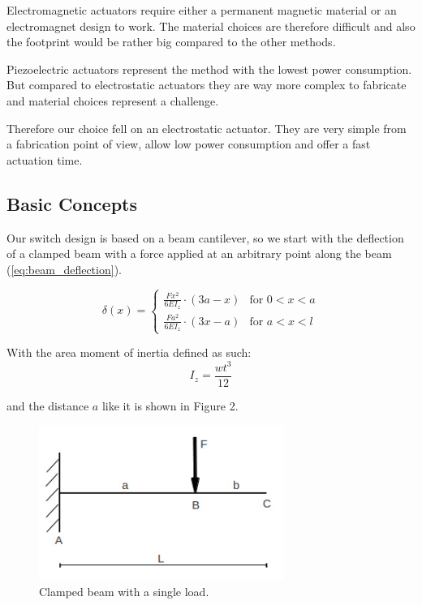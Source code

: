 Electromagnetic actuators require either a permanent magnetic material or an electromagnet design to work.
The material choices are therefore difficult and also the footprint would be rather big compared to the other methods.

Piezoelectric actuators represent the method with the lowest power consumption.
But compared to electrostatic actuators they are way more complex to fabricate and material choices represent a challenge.\cite{klaasse2002piezoelectric}

Therefore our choice fell on an electrostatic actuator.
They are very simple from a fabrication point of view, allow low power consumption and offer a fast actuation time.

\subsection{Basic Concepts}
\label{sec:basic_concepts}

Our switch design is based on a beam cantilever, so we start with the deflection of a clamped beam with a force applied at an arbitrary point along the beam (\ref{eq:beam_deflection}).

\begin{equation}
    \delta(x) = \begin{cases} \frac{Fx^2}{6EI_z} \cdot (3a-x) & \mbox{for } 0 < x < a \\
                              \frac{Fa^2}{6EI_z} \cdot (3x-a) & \mbox{for } a < x < l
                \end{cases}
    \label{eq:beam_deflection}
\end{equation}


With the area moment of inertia defined as such:
\begin{equation}
	I_z = \frac{wt^3}{12}
	\label{eq:area_moment_of_inertia}
\end{equation}

and the distance $a$ like it is shown in Figure 2.

\begin{figure}[h]
	\centering
	\includegraphics[width=8cm]{fig/cantilever_beam_single_load.png}
    \caption{Clamped beam with a single load.}
	\label{fig:cantilever_beam}
\end{figure}

